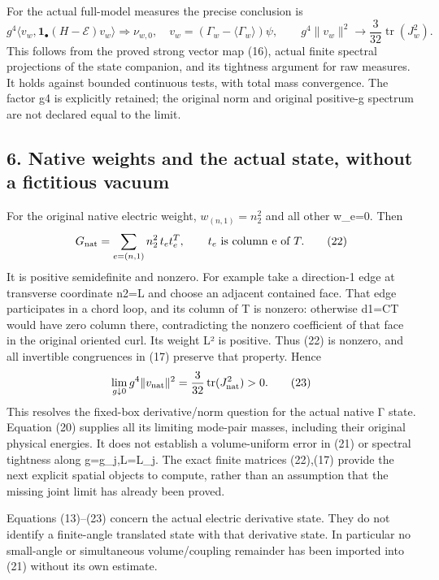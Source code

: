 \documentclass[
  11pt,
]{article}
\begin{document}
For the actual full-model measures the precise conclusion is \[
 g^4\langle v_w,\mathbf1_{\bullet}(H-\mathcal E)v_w\rangle
       \Longrightarrow\nu_{w,0},\quad
 v_w=(\Gamma_w-\langle\Gamma_w\rangle)\psi,
 \qquad
 g^4\|v_w\|^2\to\frac3{32}\operatorname{tr}(J_w^2).        \tag{21}
\] This follows from the proved strong vector map (16), actual finite
spectral projections of the state companion, and its tightness argument
for raw measures. It holds against bounded continuous tests, with total
mass convergence. The factor g4 is explicitly retained; the original
norm and original positive-g spectrum are not declared equal to the
limit.

\subsection{6. Native weights and the actual state, without a fictitious
vacuum}\label{weak-coupling-part-3-native-weights-and-the-actual-state-without-a-fictitious-vacuum}

For the original native electric weight, \(w_{(n,1)}=n_2^2\) and all
other w\_e=0. Then \[
 G_{\rm nat}=\sum_{e=(n,1)}n_2^2\,t_et_e^T,
 \qquad t_e\text{ is column e of }T.                       \tag{22}
\] It is positive semidefinite and nonzero. For example take a
direction-1 edge at transverse coordinate n2=L and choose an adjacent
contained face. That edge participates in a chord loop, and its column
of T is nonzero: otherwise d1=CT would have zero column there,
contradicting the nonzero coefficient of that face in the original
oriented curl. Its weight L² is positive. Thus (22) is nonzero, and all
invertible congruences in (17) preserve that property. Hence \[
 \lim_{g\downarrow0}g^4\|v_{\rm nat}\|^2
              =\frac3{32}\operatorname{tr}(J_{\rm nat}^2)>0.\tag{23}
\] This resolves the fixed-box derivative/norm question for the actual
native Γ state. Equation (20) supplies all its limiting mode-pair
masses, including their original physical energies. It does not
establish a volume-uniform error in (21) or spectral tightness along
g=g\_j,L=L\_j. The exact finite matrices (22),(17) provide the next
explicit spatial objects to compute, rather than an assumption that the
missing joint limit has already been proved.

Equations (13)--(23) concern the actual electric derivative state. They
do not identify a finite-angle translated state with that derivative
state. In particular no small-angle or simultaneous volume/coupling
remainder has been imported into (21) without its own estimate.
\end{document}
